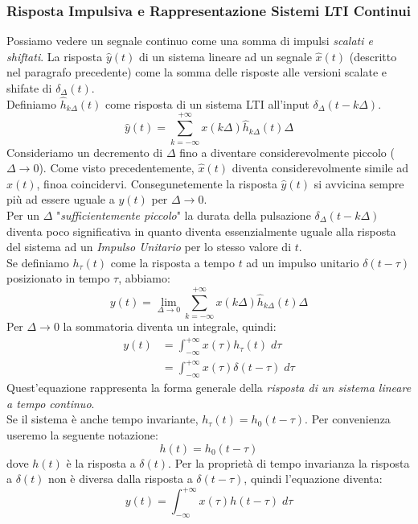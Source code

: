\documentclass{article}
\begin{document}
			\subsubsection{Risposta Impulsiva e Rappresentazione Sistemi LTI Continui}
				Possiamo vedere un segnale continuo come una somma di impulsi \textit{scalati e shiftati}. La risposta $ \hat{y}(t) $ di un sistema lineare ad un segnale $ \hat{x}(t) $ (descritto nel paragrafo precedente) come la somma delle risposte alle versioni scalate e shifate di $ \delta_\Delta(t) $. \\
				Definiamo $ \hat{h}_{k\Delta}(t) $ come risposta di un sistema LTI all'input $ \delta_\Delta(t-k\Delta) $.
				\[
					\hat{y}(t)=\sum_{k=-\infty}^{+\infty} {x(k\Delta)\hat{h}_{k\Delta}(t)\Delta}
				\]
				Consideriamo un decremento di $ \Delta $ fino a diventare considerevolmente piccolo ($ \Delta \rightarrow 0 $). Come visto precedentemente, $ \hat{x}(t) $ diventa considerevolmente simile ad $ x(t) $, finoa coincidervi. Consegunetemente la risposta $ \hat{y}(t) $ si avvicina sempre più ad essere uguale a $ y(t) $ per $ \Delta \rightarrow 0 $. \\
				Per un $ \Delta $ "\textit{sufficientemente piccolo}" la durata della pulsazione $ \delta_\Delta(t-k\Delta) $ diventa poco significativa in quanto diventa essenzialmente uguale alla risposta del sistema ad un \textit{Impulso Unitario} per lo stesso valore di $ t $. \\
				Se definiamo $ h_\tau(t) $ come la risposta a tempo $ t $ ad un impulso unitario $ \delta(t-\tau) $ posizionato in tempo $ \tau $, abbiamo:
				\[
					y(t)= \lim_{\Delta \rightarrow 0} {\sum_{k=-\infty}^{+\infty} {x(k\Delta)\hat{h}_{k\Delta}(t)\Delta}}
				\]
				Per $ \Delta \rightarrow 0 $ la sommatoria diventa un integrale, quindi:
				\[
					\begin{aligned}
						y(t)&=\int_{-\infty}^{+\infty} {x(\tau)h_{\tau}(t)\; d\tau} \\
							&=\int_{-\infty}^{+\infty} {x(\tau)\delta(t-\tau)\; d\tau}
					\end{aligned}
				\]
				Quest'equazione rappresenta la forma generale della \textit{risposta di un sistema lineare a tempo continuo}. \\
				Se il sistema è anche tempo invariante, $ h_\tau(t)=h_0(t-\tau) $. Per convenienza useremo la seguente notazione:
				\[
					h(t)=h_0(t-\tau)
				\]
				dove $ h(t) $ è la risposta a $ \delta(t) $.
				Per la proprietà di tempo invarianza la risposta a $ \delta(t) $ non è diversa dalla risposta a $ \delta(t-\tau) $, quindi l'equazione diventa:
				\[
					y(t)=\int_{-\infty}^{+\infty} {x(\tau)h(t-\tau)\; d\tau}
				\]
\end{document}
